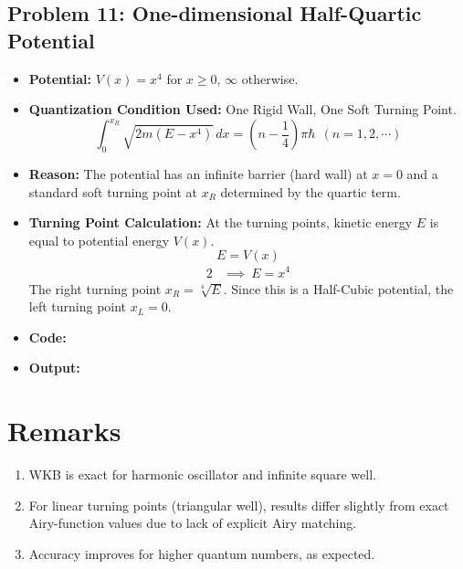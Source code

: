 \documentclass[12pt, a4paper, twoside]{article}
\begin{document}
        \subsection{Problem 11: One-dimensional Half-Quartic Potential}
        \begin{itemize}
            \item {\bf Potential: } $V(x) = x^4$ for $x \geq 0$, $\infty$ otherwise.
            \item {\bf Quantization Condition Used: } One Rigid Wall, One Soft Turning Point. $${\int_{0}^{x_R} \sqrt{2m(E - x^4)} \, dx} = {\left(n - \frac{1}{4}\right) \pi \hbar} ~~ (n = 1, 2, \cdots)$$
            \item {\bf Reason: }  The potential has an infinite barrier (hard wall) at $x=0$ and a standard soft turning point at $x_R$ determined by the quartic term.
            \item {\bf Turning Point Calculation: } At the turning points, kinetic energy $E$ is equal to potential energy $V(x)$. $$E = V(x)$$ \begin{alignat*}{2}
                &\implies ~ E = x^4
            \end{alignat*}
            The right turning point $ \boxed{x_R = \sqrt[4]{E}}$. Since this is a Half-Cubic potential, the left turning point $\boxed{x_L = 0}$.
            \item {\bf Code: } 
            \item {\bf Output: } 
        \end{itemize}

    \section{Remarks}
    \begin{enumerate}
        \item WKB is exact for harmonic oscillator and infinite square well.
        \item For linear turning points (triangular well), results differ slightly from exact Airy-function values due to lack of explicit Airy matching.
        \item Accuracy improves for higher quantum numbers, as expected.
    \end{enumerate}
\end{document}
